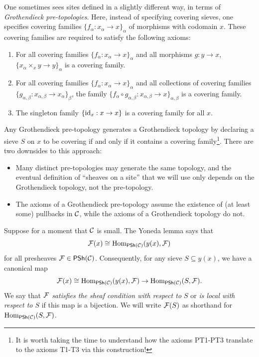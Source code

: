 \begin{remark}\label{remark:chap:sheaves:sec:sites:grothendieck pretopologies}
    One sometimes sees sites defined in a slightly different way, in terms of \emph{Grothendieck pre-topologies}. Here, instead of specifying covering sieves, one specifies covering families $\{f_\alpha : x_\alpha \to x\}_\alpha$ of morphisms with codomain $x$. These covering families are required to satisfy the following axioms:
    \begin{enumerate}[label=(PT\arabic*)]
        \item For all covering families $\{f_\alpha : x_\alpha \to x\}_\alpha$ and all morphisms $g : y \to x$, $\{x_\alpha \times_x y \to y\}_\alpha$ is a covering family.
        \item For all covering families $\{f_\alpha : x_\alpha \to x\}_\alpha$ and all collections of covering families $\{g_{\alpha,\beta} : x_{\alpha,\beta} \to x_\alpha\}_\beta$, the family $\{f_\alpha \circ g_{\alpha,\beta} : x_{\alpha,\beta} \to x\}_{\alpha,\beta}$ is a covering family.
        \item The singleton family $\{\id_x : x \to x\}$ is a covering family for all $x$.
    \end{enumerate}
    Any Grothendieck pre-topology generates a Grothendieck topology by declaring a sieve $S$ on $x$ to be covering if and only if it contains a covering family\footnote{It is worth taking the time to understand how the axioms PT1-PT3 translate to the axioms T1-T3 via this construction!}. There are two downsides to this approach:
    \begin{itemize}
        \item Many distinct pre-topologies may generate the same topology, and the eventual definition of ``sheaves on a site'' that we will use only depends on the Grothendieck topology, not the pre-topology.
        \item The axioms of a Grothendieck pre-topology assume the existence of (at least some) pullbacks in $\catC$, while the axioms of a Grothendieck topology do not.
    \end{itemize}
\end{remark}

Suppose for a moment that $\catC$ is small. The Yoneda lemma says that
\[\cal{F}(x) \cong \Hom_{\PSh(\catC)}(y(x),\cal{F})\]
for all presheaves $\cal{F} \in \PSh(\catC)$. Consequently, for any sieve $S \subseteq y(x)$, we have a canonical map
\[\cal{F}(x) \cong \Hom_{\PSh(\catC)}(y(x),\cal{F}) \to \Hom_{\PSh(\catC)}(S,\cal{F}).\]
We say that $\cal{F}$ \emph{satisfies the sheaf condition with respect to $S$} or \emph{is local with respect to $S$} if this map is a bijection. We will write $\cal{F}(S)$ as shorthand for $\Hom_{\PSh(\catC)}(S,\cal{F})$.

